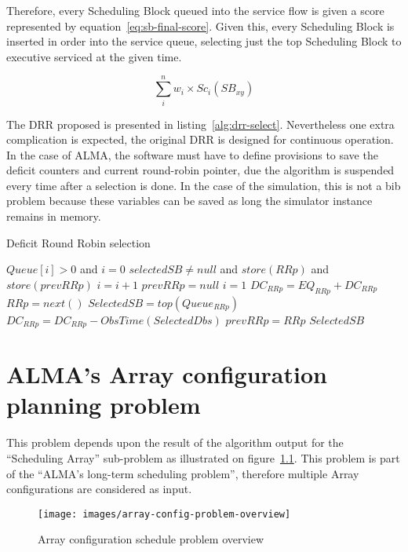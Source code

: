 Therefore, every Scheduling Block queued into the service flow is given a score represented by equation~\ref{eq:sb-final-score}. Given this, every Scheduling Block is inserted in order into the service queue, selecting just the top Scheduling Block to executive serviced at the given time.

\begin{equation}
\label{eq:sb-final-score}
\sum_{i}^{n} w_i\times Sc_i(SB_{xy})
\end{equation}

The DRR proposed is presented in listing~\ref{alg:drr-select}. Nevertheless one extra complication is expected, the original DRR is designed for continuous operation. In the case of ALMA, the software must have to define provisions to save the deficit counters and current round-robin pointer, due the algorithm is suspended every time after a selection is done. In the case of the simulation, this is not a bib problem because these variables can be saved as long the simulator instance remains in memory.

\begin{algorithm}                     
\caption{Deficit Round Robin selection}          
\label{alg:drr-select}                   
\begin{algorithmic}                    
    \REQUIRE $Queue[i] > 0$ and $i = 0$
    \ENSURE $selectedSB \neq null$ and $store(RRp)$ and $store(prevRRp)$
    \REPEAT
    \STATE $i = i + 1$
    \STATE $prevRRp = null$
    \STATE $i = 1$
    \ENDIF
    \STATE $DC_{RRp} = EQ_{RRp} + DC_{RRp}$
    \ENDIF
    \STATE  $RRp = next()$
    \ENDIF
    \STATE $SelectedSB = top(Queue_{RRp})$
    \STATE $DC_{RRp} = DC_{RRp} - ObsTime(SelectedDbs)$
    \STATE $prevRRp = RRp$
    \ENDIF
    \RETURN  $SelectedSB$
\end{algorithmic}
\end{algorithm}


\chapter{ALMA's Array configuration planning problem}
\label{sec:array-config-plan}
This problem depends upon the result of the algorithm output for the ``Scheduling Array'' sub-problem as illustrated on figure~\ref{fig:array-config-problem-overview}. This problem is part of the ``ALMA's  long-term scheduling problem'', therefore multiple Array configurations are considered as input.
\begin{figure}[h!]
\begin{center}
\texttt{[image: images/array-config-problem-overview]}
\end{center}
\caption{Array configuration schedule problem overview}
\label{fig:array-config-problem-overview}
\end{figure}

